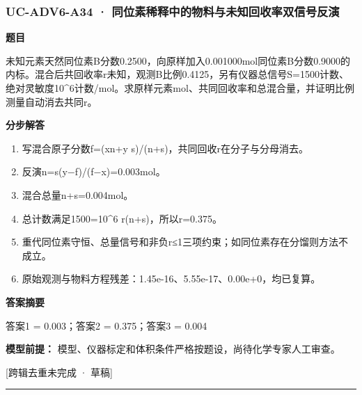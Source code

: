\documentclass[UTF8,11pt,a4paper]{ctexart}
\begin{document}
\subsubsection*{UC-ADV6-A34 · 同位素稀释中的物料与未知回收率双信号反演}
\noindent\textbf{题目}\par
未知元素天然同位素B分数0.2500，向原样加入0.001000mol同位素B分数0.9000的内标。混合后共回收率r未知，观测B比例0.4125，另有仪器总信号S=1500计数、绝对灵敏度10\textasciicircum{}6计数/mol。求原样元素mol、共同回收率和总混合量，并证明比例测量自动消去共同r。\par
\medskip\noindent\textbf{分步解答}
\begin{enumerate}
\item 写混合原子分数f=(xn+y s)/(n+s)，共同回收r在分子与分母消去。
\item 反演n=s(y−f)/(f−x)=0.003mol。
\item 混合总量n+s=0.004mol。
\item 总计数满足1500=10\textasciicircum{}6 r(n+s)，所以r=0.375。
\item 重代同位素守恒、总量信号和非负r≤1三项约束；如同位素存在分馏则方法不成立。
\item 原始观测与物料方程残差：1.45e-16、5.55e-17、0.00e+0，均已复算。
\end{enumerate}
\noindent\textbf{答案摘要}\par
答案1 = 0.003；答案2 = 0.375；答案3 = 0.004\par
\noindent\textbf{模型前提：}
模型、仪器标定和体积条件严格按题设，尚待化学专家人工审查。\par
\noindent\textcolor{red!65!black}{[跨辑去重未完成 · 草稿]} \par
\medskip\hrule\medskip
{}
\end{document}

